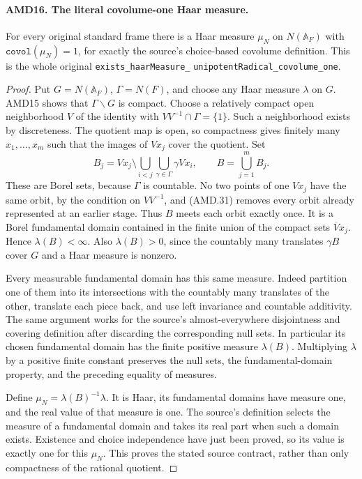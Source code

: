 \documentclass[11pt,a4paper]{article}
\numberwithin{equation}{section}
\theoremstyle{remark}\newtheorem{remark}[theorem]{Remark}
\begin{document}

\paragraph{AMD16. The literal covolume-one Haar measure.}
\label{claim:AMD16}
For every original standard frame there is a Haar measure
\(\mu_N\) on \(N(\mathbb A_F)\) with
\(\texttt{covol}(\mu_N)=1\), for exactly the source's
choice-based covolume definition.  This is the whole original
\texttt{exists\_\allowbreak haar\allowbreak Measure\_\allowbreak }\allowbreak
\texttt{unipotent\allowbreak Radical\_\allowbreak }\allowbreak\texttt{covolume\_\allowbreak one}.

\begin{proof}
Put \(G=N(\mathbb A_F)\), \(\Gamma=N(F)\), and choose
any Haar measure \(\lambda\) on \(G\).  AMD15 shows that
\(\Gamma\backslash G\) is compact.  Choose a relatively
compact open neighborhood \(V\) of the identity with
\(VV^{-1}\cap\Gamma=\{1\}\).  Such a neighborhood exists
by discreteness.  The quotient map is open, so compactness
gives finitely many \(x_1,\ldots,x_m\) such that the images
of \(Vx_j\) cover the quotient.  Set
\[
 B_j=Vx_j\setminus\bigcup_{i<j}\bigcup_{\gamma\in\Gamma}
                                     \gamma Vx_i,
 \qquad B=\bigcup_{j=1}^m B_j.
 \tag{AMD.31}
\]
These are Borel sets, because \(\Gamma\) is countable.
No two points of one \(Vx_j\) have the same orbit, by the
condition on \(VV^{-1}\), and (AMD.31) removes every orbit
already represented at an earlier stage.  Thus \(B\) meets
each orbit exactly once.  It is a Borel fundamental domain
contained in the finite union of the compact sets
\(\overline Vx_j\).  Hence \(\lambda(B)<\infty\).
Also \(\lambda(B)>0\), since the countably many translates
\(\gamma B\) cover \(G\) and a Haar measure is nonzero.

Every measurable fundamental domain has this same measure.
Indeed partition one of them into its intersections with the
countably many translates of the other, translate each piece
back, and use left invariance and countable additivity.  The
same argument works for the source's almost-everywhere
disjointness and covering definition after discarding the
corresponding null sets.  In particular its chosen fundamental
domain has the finite positive measure \(\lambda(B)\).
Multiplying \(\lambda\) by a positive finite constant
preserves the null sets, the fundamental-domain property, and
the preceding equality of measures.

Define \(\mu_N=\lambda(B)^{-1}\lambda\).  It is Haar,
its fundamental domains have measure one, and the real value
of that measure is one.  The source's definition selects the
measure of a fundamental domain and takes its real part when
such a domain exists.  Existence and choice independence have
just been proved, so its value is exactly one for this
\(\mu_N\).  This proves the stated source contract, rather
than only compactness of the rational quotient.
\end{proof}
\end{document}
